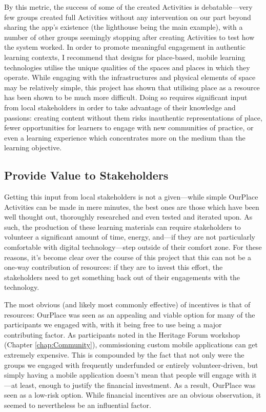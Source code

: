 By this metric, the success of some of the created Activities is debatable---very few groups created full Activities without any intervention on our part beyond sharing the app's existence (the lighthouse being the main example), with a number of other groups seemingly stopping after creating Activities to test how the system worked. In order to promote meaningful engagement in authentic learning contexts, I recommend that designs for place-based, mobile learning technologies utilise the unique qualities of the spaces and places in which they operate. While engaging with the infrastructures and physical elements of space may be relatively simple, this project has shown that utilising place as a resource has been shown to be much more difficult. Doing so requires significant input from local stakeholders in order to take advantage of their knowledge and passions: creating content without them risks inauthentic representations of place, fewer opportunities for learners to engage with new communities of practice, or even a learning experience which concentrates more on the medium than the learning objective. 

\subsection{Provide Value to Stakeholders}

Getting this input from local stakeholders is not a given---while simple OurPlace Activities can be made in mere minutes, the best ones are those which have been well thought out, thoroughly researched and even tested and iterated upon. As such, the production of these learning materials can require stakeholders to volunteer a significant amount of time, energy, and---if they are not particularly comfortable with digital technology---step outside of their comfort zone. For these reasons, it's become clear over the course of this project that this can not be a one-way contribution of resources: if they are to invest this effort, the stakeholders need to get something back out of their engagements with the technology.

The most obvious (and likely most commonly effective) of incentives is that of resources: OurPlace was seen as an appealing and viable option for many of the participants we engaged with, with it being free to use being a major contributing factor. As participants noted in the Heritage Forum workshop (Chapter \ref{chap:Community}), commissioning custom mobile applications can get extremely expensive. This is compounded by the fact that not only were the groups we engaged with frequently underfunded or entirely volunteer-driven, but simply having a mobile application doesn't mean that people will engage with it---at least, enough to justify the financial investment. As a result, OurPlace was seen as a low-risk option. While financial incentives are an obvious observation, it seemed to nevertheless be an influential factor.

